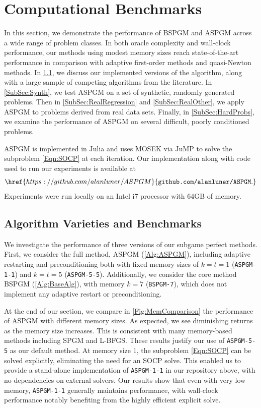 \documentclass[11pt]{article}
\numberwithin{equation}{section}
\theoremstyle{definition}
\theoremstyle{plain}
\theoremstyle{definition}
\begin{document}
\section{Computational Benchmarks} \label{Sec:Numerics}

In this section, we demonstrate the performance of BSPGM and ASPGM across a wide range of problem classes. In both oracle complexity and wall-clock performance, our methods using modest memory sizes reach state-of-the-art performance in comparison with adaptive first-order methods and quasi-Newton methods.
In \cref{SubSec:AlgDiscussion}, we discuss our implemented versions of the algorithm, along with a large sample of competing algorithms from the literature. In \cref{SubSec:Synth}, we test ASPGM on a set of synthetic, randomly generated problems. Then in \cref{SubSec:RealRegression} and \cref{SubSec:RealOther}, we apply ASPGM to problems derived from real data sets. Finally, in \cref{SubSec:HardProbs}, we examine the performance of ASPGM on several difficult, poorly conditioned problems.

ASPGM is implemented in Julia \cite{julia} and uses MOSEK \cite{mosek} via JuMP \cite{JuMP} to solve the subproblem \eqref{Eqn:SOCP} at each iteration. Our implementation along with code used to run our experiments is available at 
\begin{equation*}
\href{https://github.com/alanluner/ASPGM}{\texttt{github.com/alanluner/ASPGM}.}
\end{equation*}
Experiments were run locally on an Intel i7 processor with 64GB of memory.

\subsection{Algorithm Varieties and Benchmarks} \label{SubSec:AlgDiscussion}

We investigate the performance of three versions of our subgame perfect methods. First, we consider the full method, ASPGM (\cref{Alg:ASPGM}), including adaptive restarting and preconditioning both with fixed memory sizes of $k=t=1$ (\texttt{ASPGM-1-1}) and $k=t=5$ (\texttt{ASPGM-5-5}). Additionally, we consider the core method BSPGM (\cref{Alg:BaseAlg}), with memory $k=7$ (\texttt{BSPGM-7}), which does not implement any adaptive restart or preconditioning.

At the end of our section, we compare in \cref{Fig:MemComparison} the performance of ASPGM with different memory sizes. As expected, we see diminishing returns as the memory size increases. This is consistent with many memory-based methods including SPGM and L-BFGS. These results justify our use of \texttt{ASPGM-5-5} as our default method. At memory size 1, the subproblem \eqref{Eqn:SOCP} can be solved explicitly, eliminating the need for an SOCP solve. This enabled us to provide a stand-alone implementation of \texttt{ASPGM-1-1} in our repository above, with no dependencies on external solvers. Our results show that even with very low memory, \texttt{ASPGM-1-1} generally maintains performance, with wall-clock performance notably benefiting from the highly efficient explicit solve.
\end{document}
